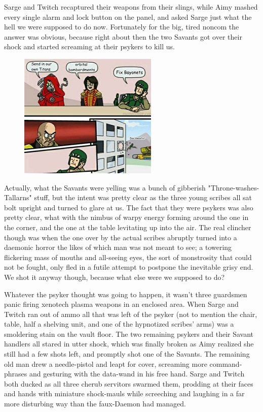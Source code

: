 Sarge and Twitch recaptured their weapons from their slings, while Aimy mashed every single alarm and lock button on the panel, and asked Sarge just what the hell we were supposed to do now. 
Fortunately for the big, tired noncom the answer was obvious, because right about then the two Savants got over their shock and started screaming at their psykers to kill us.

\begin{figure}
	\begin{center}
		\includegraphics[width=\figwidth]{pics/21/87.png}
	\end{center}
\end{figure}
Actually, what the Savants were yelling was a bunch of gibberish "Throne-washes-Tallarns" stuff, but the intent was pretty clear as the three young scribes all sat bolt upright and turned to glare at us. 
The fact that they were psykers was also pretty clear, what with the nimbus of warpy energy forming around the one in the corner, and the one at the table levitating up into the air. 
The real clincher though was when the one over by the actual scribes abruptly turned into a daemonic horror the likes of which man was not meant to see; 
a towering flickering mass of mouths and all-seeing eyes, the sort of monstrosity that could not be fought, only fled in a futile attempt to postpone the inevitable grisy end. 
We shot it anyway though, because what else were we supposed to do?

Whatever the psyker thought was going to happen, it wasn't three guardsmen panic firing xenotech plasma weapons in an enclosed area. 
When Sarge and Twitch ran out of ammo all that was left of the psyker (not to mention the chair, table, half a shelving unit, and one of the hypnotized scribes' arms) was a smoldering stain on the vault floor. 
The two remaining psykers and their Savant handlers all stared in utter shock, which was finally broken as Aimy realized she still had a few shots left, and promptly shot one of the Savants. 
The remaining old man drew a needle-pistol and leapt for cover, screaming more command-phrases and gesturing with the data-wand in his free hand. 
Sarge and Twitch both ducked as all three cherub servitors swarmed them, prodding at their faces and hands with miniature shock-mauls while screeching and laughing in a far more disturbing way than the faux-Daemon had managed. 


